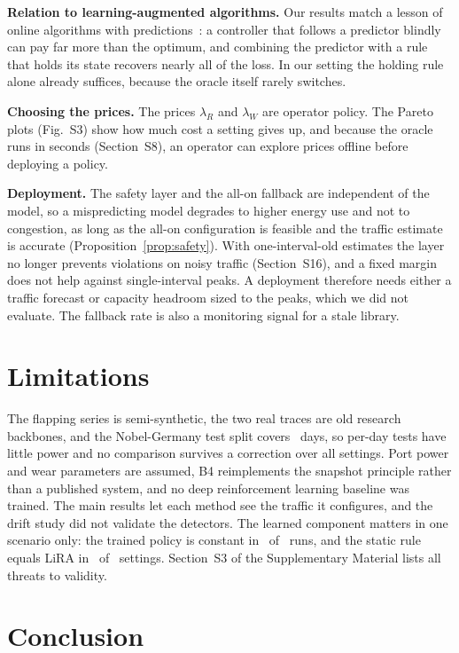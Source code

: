 \documentclass[5p,times]{elsarticle}
\begin{document}
\textbf{Relation to learning-augmented algorithms.} Our results match a lesson of online algorithms with predictions~\cite{lykouris2021caching,antoniadis2023mts}: a controller that follows a predictor blindly can pay far more than the optimum, and combining the predictor with a rule that holds its state recovers nearly all of the loss. In our setting the holding rule alone already suffices, because the oracle itself rarely switches.

\textbf{Choosing the prices.} The prices $\lambda_R$ and $\lambda_W$ are operator policy. The Pareto plots (Fig.~S3) show how much cost a setting gives up, and because the oracle runs in seconds (Section~S8), an operator can explore prices offline before deploying a policy.

\textbf{Deployment.} The safety layer and the all-on fallback are independent of the model, so a mispredicting model degrades to higher energy use and not to congestion, as long as the all-on configuration is feasible and the traffic estimate is accurate (Proposition~\ref{prop:safety}). With one-interval-old estimates the layer no longer prevents violations on noisy traffic (Section~S16), and a fixed margin does not help against single-interval peaks. A deployment therefore needs either a traffic forecast or capacity headroom sized to the peaks, which we did not evaluate. The fallback rate is also a monitoring signal for a stale library.

\section{Limitations}\label{sec:limitations}

The flapping series is semi-synthetic, the two real traces are old research backbones, and the Nobel-Germany test split covers \nobTestDays\ days, so per-day tests have little power and no comparison survives a correction over all settings. Port power and wear parameters are assumed, B4 reimplements the snapshot principle rather than a published system, and no deep reinforcement learning baseline was trained. The main results let each method see the traffic it configures, and the drift study did not validate the detectors. The learned component matters in one scenario only: the trained policy is constant in \liraConstRuns\ of \liraTotalRuns\ runs, and the static rule equals LiRA in \staticSame\ of \staticTotal\ settings. Section~S3 of the Supplementary Material lists all threats to validity.

\section{Conclusion}\label{sec:conclusion}
\end{document}

